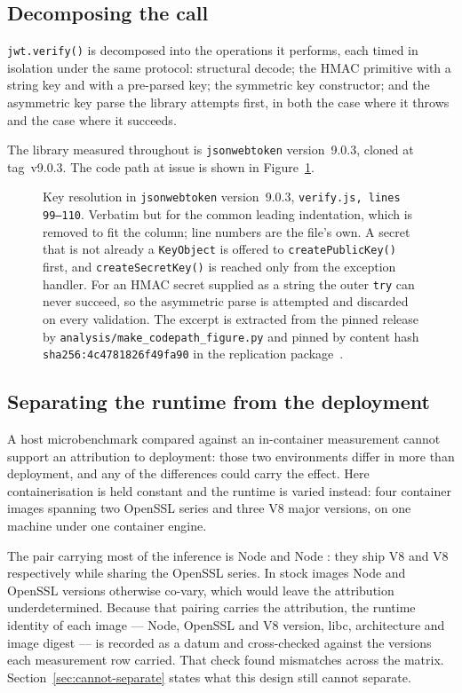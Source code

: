 \documentclass[pdflatex,sn-basic,twocolumn]{sn-jnl}%
\newif\ifshowauthornotes
\newcommand{\TODO}[1]{\ifshowauthornotes\textcolor{notered}{\textbf{#1}}\else#1\fi}
\newcommand{\LibraryName}{\texttt{jsonwebtoken}}
\newcommand{\LibraryVersion}{\TODO{version~9.0.3}}
\newcommand{\LibraryTag}{\TODO{tag~v9.0.3}}
\newcommand{\CodeFileLines}{\TODO{verify.js, lines 99--110}}
\newcommand{\CodeFirstLine}{99}
\newcommand{\CodeExcerptHash}{sha256:4c4781826f49fa90}
\begin{document}
\subsection{Decomposing the call}\label{sec:decompose}

\texttt{jwt.verify()} is decomposed into the operations it performs, each timed
in isolation under the same protocol: structural decode; the HMAC primitive with
a string key and with a pre-parsed key; the symmetric key constructor; and the
asymmetric key parse the library attempts first, in both the case where it
throws and the case where it succeeds.

The library measured throughout is \LibraryName{} \LibraryVersion{}, cloned at
\LibraryTag. The code path at issue is shown in Figure~\ref{fig:codepath}.

\begin{figure}[t]

\caption{Key resolution in \LibraryName{} \LibraryVersion{},
\texttt{\CodeFileLines}. Verbatim but for the common leading indentation,
which is removed to fit the column; line numbers are the file's own. A secret
that is not already a \texttt{KeyObject} is offered to
\texttt{createPublicKey()} first, and \texttt{createSecretKey()} is reached only
from the exception handler. For an HMAC secret supplied as a string the outer
\texttt{try} can never succeed, so the asymmetric parse is attempted and
discarded on every validation. The excerpt is extracted from the pinned release
by \texttt{analysis/make\_codepath\_figure.py} and pinned by content hash
\texttt{\CodeExcerptHash} in the replication package~\cite{artifact2026}.}
\label{fig:codepath}
\end{figure}

\subsection{Separating the runtime from the deployment}\label{sec:matrix-method}

A host microbenchmark compared against an in-container measurement cannot
support an attribution to deployment: those two environments differ in more than
deployment, and any of the differences could carry the effect. Here
containerisation is held constant and the runtime is varied instead:
four container images spanning two OpenSSL series and three V8 major versions,
on one machine under one container engine.

The pair carrying most of the inference is Node \NodeEighteenNodeMajor{} and
Node \NodeTwentyNodeMajor: they ship V8 \NodeEighteenVeight{} and V8
\NodeTwentyVeight{} respectively while sharing the OpenSSL
\NodeEighteenOpensslSeries{} series. In stock images Node and OpenSSL versions
otherwise co-vary, which would leave the attribution underdetermined. Because
that pairing carries the attribution, the runtime identity of each image ---
Node, OpenSSL and V8 version, libc, architecture and image digest --- is
recorded as a datum and cross-checked against the versions each measurement row
carried. That check found \IdentityMismatches{} mismatches across the matrix.
Section~\ref{sec:cannot-separate} states what this design still cannot separate.
\end{document}
